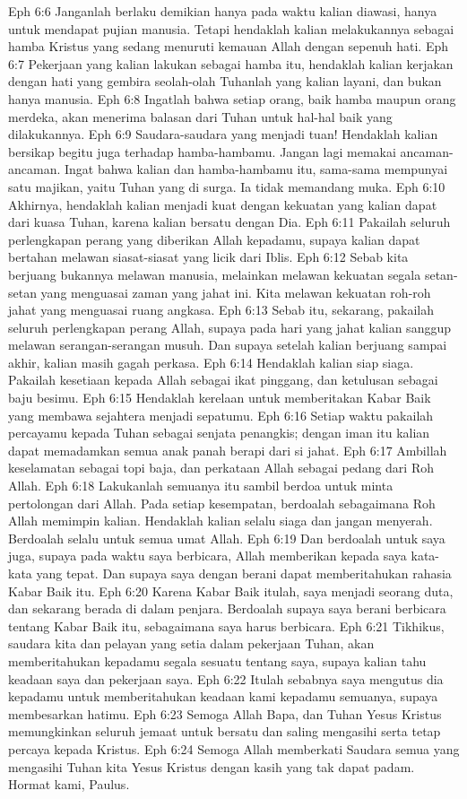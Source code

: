 Eph 6:6  Janganlah berlaku demikian hanya pada waktu kalian diawasi, hanya untuk mendapat pujian manusia. Tetapi hendaklah kalian melakukannya sebagai hamba Kristus yang sedang menuruti kemauan Allah dengan sepenuh hati.
Eph 6:7  Pekerjaan yang kalian lakukan sebagai hamba itu, hendaklah kalian kerjakan dengan hati yang gembira seolah-olah Tuhanlah yang kalian layani, dan bukan hanya manusia.
Eph 6:8  Ingatlah bahwa setiap orang, baik hamba maupun orang merdeka, akan menerima balasan dari Tuhan untuk hal-hal baik yang dilakukannya.
Eph 6:9  Saudara-saudara yang menjadi tuan! Hendaklah kalian bersikap begitu juga terhadap hamba-hambamu. Jangan lagi memakai ancaman-ancaman. Ingat bahwa kalian dan hamba-hambamu itu, sama-sama mempunyai satu majikan, yaitu Tuhan yang di surga. Ia tidak memandang muka.
Eph 6:10  Akhirnya, hendaklah kalian menjadi kuat dengan kekuatan yang kalian dapat dari kuasa Tuhan, karena kalian bersatu dengan Dia.
Eph 6:11  Pakailah seluruh perlengkapan perang yang diberikan Allah kepadamu, supaya kalian dapat bertahan melawan siasat-siasat yang licik dari Iblis.
Eph 6:12  Sebab kita berjuang bukannya melawan manusia, melainkan melawan kekuatan segala setan-setan yang menguasai zaman yang jahat ini. Kita melawan kekuatan roh-roh jahat yang menguasai ruang angkasa.
Eph 6:13  Sebab itu, sekarang, pakailah seluruh perlengkapan perang Allah, supaya pada hari yang jahat kalian sanggup melawan serangan-serangan musuh. Dan supaya setelah kalian berjuang sampai akhir, kalian masih gagah perkasa.
Eph 6:14  Hendaklah kalian siap siaga. Pakailah kesetiaan kepada Allah sebagai ikat pinggang, dan ketulusan sebagai baju besimu.
Eph 6:15  Hendaklah kerelaan untuk memberitakan Kabar Baik yang membawa sejahtera menjadi sepatumu.
Eph 6:16  Setiap waktu pakailah percayamu kepada Tuhan sebagai senjata penangkis; dengan iman itu kalian dapat memadamkan semua anak panah berapi dari si jahat.
Eph 6:17  Ambillah keselamatan sebagai topi baja, dan perkataan Allah sebagai pedang dari Roh Allah.
Eph 6:18  Lakukanlah semuanya itu sambil berdoa untuk minta pertolongan dari Allah. Pada setiap kesempatan, berdoalah sebagaimana Roh Allah memimpin kalian. Hendaklah kalian selalu siaga dan jangan menyerah. Berdoalah selalu untuk semua umat Allah.
Eph 6:19  Dan berdoalah untuk saya juga, supaya pada waktu saya berbicara, Allah memberikan kepada saya kata-kata yang tepat. Dan supaya saya dengan berani dapat memberitahukan rahasia Kabar Baik itu.
Eph 6:20  Karena Kabar Baik itulah, saya menjadi seorang duta, dan sekarang berada di dalam penjara. Berdoalah supaya saya berani berbicara tentang Kabar Baik itu, sebagaimana saya harus berbicara.
Eph 6:21  Tikhikus, saudara kita dan pelayan yang setia dalam pekerjaan Tuhan, akan memberitahukan kepadamu segala sesuatu tentang saya, supaya kalian tahu keadaan saya dan pekerjaan saya.
Eph 6:22  Itulah sebabnya saya mengutus dia kepadamu untuk memberitahukan keadaan kami kepadamu semuanya, supaya membesarkan hatimu.
Eph 6:23  Semoga Allah Bapa, dan Tuhan Yesus Kristus memungkinkan seluruh jemaat untuk bersatu dan saling mengasihi serta tetap percaya kepada Kristus.
Eph 6:24  Semoga Allah memberkati Saudara semua yang mengasihi Tuhan kita Yesus Kristus dengan kasih yang tak dapat padam. Hormat kami, Paulus.


